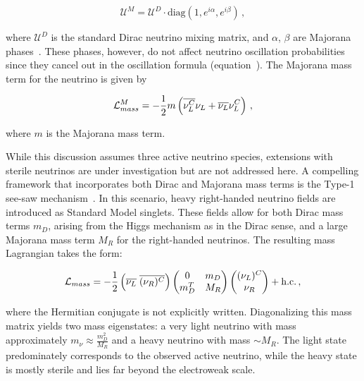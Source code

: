 \begin{equation}
\label{eq:Majorana_PMNS_matrix}
    \mathcal{U}^M = \mathcal{U}^D \cdot \text{diag}(1, e^{i \alpha}, e^{i \beta}) \,, 
\end{equation}

\noindent where $\mathcal{U}^D$ is the standard Dirac neutrino mixing matrix, and $\alpha$, $\beta$ are Majorana phases~\cite{zuber_neutrino_2020}. These phases, however, do not affect neutrino oscillation probabilities since they cancel out in the oscillation formula (equation~).
The Majorana mass term for the neutrino is given by

\begin{equation} 
\label{eq:lagr_neutrino_majorana_mass}
    \mathcal{L}^M_{mass} = - \frac{1}{2} m \left( \overline{\nu^C_L} \nu_L + \overline{\nu_L} \nu^C_L \right) \,,
\end{equation}

\noindent where $m$ is the Majorana mass term. 

While this discussion assumes three active neutrino species, extensions with sterile neutrinos are under investigation but are not addressed here. 
A compelling framework that incorporates both Dirac and Majorana mass terms is the Type-1 see-saw mechanism~\cite{yanagida_seesaw_1980}. In this scenario, heavy right-handed neutrino fields are introduced as Standard Model singlets. These fields allow for both Dirac mass terms $m_D$, arising from the Higgs mechanism as in the Dirac sense, and a large Majorana mass term $M_R$ for the right-handed neutrinos. The resulting mass Lagrangian takes the form:

\begin{equation} 
\label{eq:lagr_seesaw_mass}
    \mathcal{L}_{mass} = - \frac{1}{2} \left( \overline{\nu_L} \; \overline{(\nu_R)^C} \right)  \begin{pmatrix}
        0 & m_D \\ 
        m_D^T & M_R
    \end{pmatrix}
    \begin{pmatrix}
        (\nu_L)^C \\ \nu_R
    \end{pmatrix} + \mathrm{h.c.} \,,
\end{equation}

\noindent where the Hermitian conjugate is not explicitly written. Diagonalizing this mass matrix yields two mass eigenstates: a very light neutrino with mass approximately $m_\nu \approx \frac{m_D^2}{M_R}$ and a heavy neutrino with mass $\sim M_R$. The light state predominately corresponds to the observed active neutrino, while the heavy state is mostly sterile and lies far beyond the electroweak scale. 

